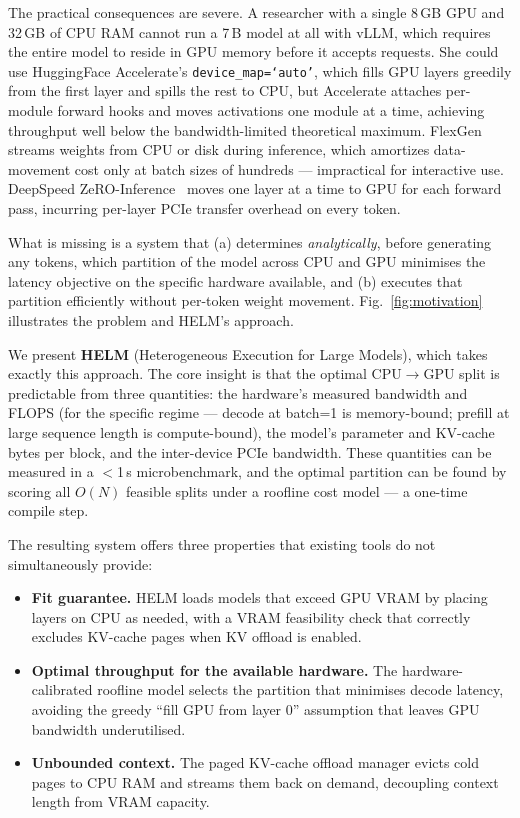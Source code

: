 \documentclass[lettersize,journal]{IEEEtran}
\begin{document}
The practical consequences are severe. A researcher with a single 8\,GB GPU
and 32\,GB of CPU RAM cannot run a 7\,B model at all with vLLM, which requires
the entire model to reside in GPU memory before it accepts requests. She could
use HuggingFace Accelerate's \texttt{device\_map=`auto'}, which
fills GPU layers greedily from the first layer and spills the rest to CPU, but
Accelerate attaches per-module forward hooks and moves activations one module
at a time, achieving throughput well below the bandwidth-limited theoretical
maximum. FlexGen~\cite{flexgen} streams weights from CPU or disk during
inference, which amortizes data-movement cost only at batch sizes of hundreds ---
impractical for interactive use. DeepSpeed ZeRO-Inference~\cite{deepspeed}
moves one layer at a time to GPU for each forward pass, incurring per-layer
PCIe transfer overhead on every token.

What is missing is a system that (a) determines \emph{analytically}, before
generating any tokens, which partition of the model across CPU and GPU
minimises the latency objective on the specific hardware available, and (b)
executes that partition efficiently without per-token weight movement.
Fig.~\ref{fig:motivation} illustrates the problem and HELM's approach.

We present \textbf{HELM} (Heterogeneous Execution for Large Models), which
takes exactly this approach. The core insight is that the optimal CPU$\to$GPU
split is predictable from three quantities: the hardware's measured bandwidth
and FLOPS (for the specific regime --- decode at batch=1 is memory-bound;
prefill at large sequence length is compute-bound), the model's parameter
and KV-cache bytes per block, and the inter-device PCIe bandwidth. These
quantities can be measured in a $<$1\,s microbenchmark, and the optimal
partition can be found by scoring all $O(N)$ feasible splits under a
roofline cost model --- a one-time compile step.

The resulting system offers three properties that existing tools do not
simultaneously provide:

\begin{itemize}
  \item \textbf{Fit guarantee.} HELM loads models that exceed GPU VRAM by
        placing layers on CPU as needed, with a VRAM feasibility check that
        correctly excludes KV-cache pages when KV offload is enabled.
  \item \textbf{Optimal throughput for the available hardware.} The
        hardware-calibrated roofline model selects the partition that
        minimises decode latency, avoiding the greedy ``fill GPU from layer 0''
        assumption that leaves GPU bandwidth underutilised.
  \item \textbf{Unbounded context.} The paged KV-cache offload manager
        evicts cold pages to CPU RAM and streams them back on demand,
        decoupling context length from VRAM capacity.
\end{itemize}
\end{document}
